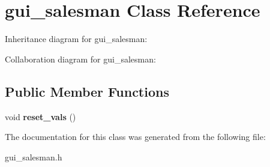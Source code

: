 \hypertarget{classgui__salesman}{}\section{gui\+\_\+salesman Class Reference}
\label{classgui__salesman}


Inheritance diagram for gui\+\_\+salesman\+:


Collaboration diagram for gui\+\_\+salesman\+:
\subsection*{Public Member Functions}
\begin{DoxyCompactItemize}
\item 
void {\bfseries reset\+\_\+vals} ()\hypertarget{classgui__salesman_ade231072dd757c87744fb2b6af670fd6}{}\label{classgui__salesman_ade231072dd757c87744fb2b6af670fd6}

\end{DoxyCompactItemize}


The documentation for this class was generated from the following file\+:\begin{DoxyCompactItemize}
\item 
gui\+\_\+salesman.\+h\end{DoxyCompactItemize}
